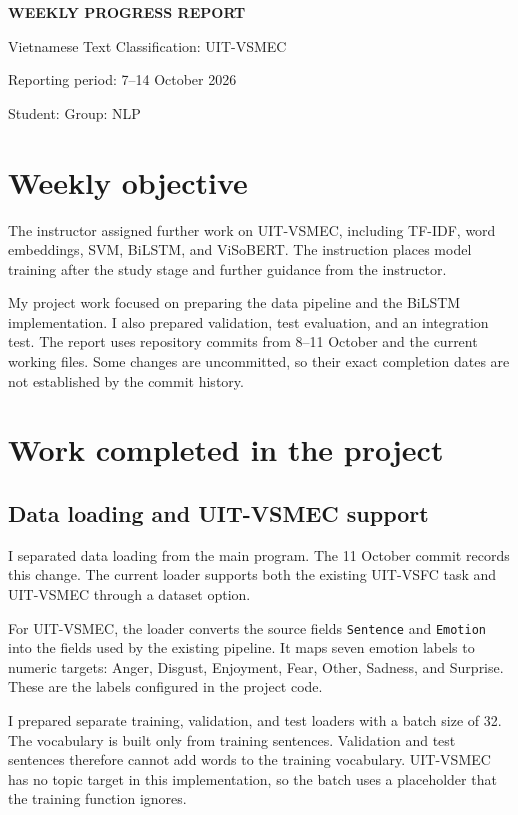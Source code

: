 \documentclass[11pt,a4paper]{article}
\begin{document}
\begin{center}
{\LARGE\bfseries WEEKLY PROGRESS REPORT}\par
{\large Vietnamese Text Classification: UIT-VSMEC}\par
Reporting period: 7--14 October 2026\par
Student: \underline{\hspace{5cm}}\quad Group: NLP
\end{center}

\section{Weekly objective}
The instructor assigned further work on UIT-VSMEC, including TF-IDF, word embeddings, SVM, BiLSTM, and ViSoBERT. The instruction places model training after the study stage and further guidance from the instructor.

My project work focused on preparing the data pipeline and the BiLSTM implementation. I also prepared validation, test evaluation, and an integration test. The report uses repository commits from 8--11 October and the current working files. Some changes are uncommitted, so their exact completion dates are not established by the commit history.

\section{Work completed in the project}
\subsection{Data loading and UIT-VSMEC support}
I separated data loading from the main program. The 11 October commit records this change. The current loader supports both the existing UIT-VSFC task and UIT-VSMEC through a dataset option.

For UIT-VSMEC, the loader converts the source fields \texttt{Sentence} and \texttt{Emotion} into the fields used by the existing pipeline. It maps seven emotion labels to numeric targets: Anger, Disgust, Enjoyment, Fear, Other, Sadness, and Surprise. These are the labels configured in the project code.

I prepared separate training, validation, and test loaders with a batch size of 32. The vocabulary is built only from training sentences. Validation and test sentences therefore cannot add words to the training vocabulary. UIT-VSMEC has no topic target in this implementation, so the batch uses a placeholder that the training function ignores.
\end{document}
